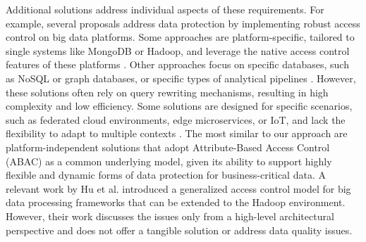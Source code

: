 Additional solutions address individual aspects of these requirements. For example, several proposals address data protection by implementing robust access control on big data platforms. Some approaches are platform-specific, tailored to single systems like MongoDB or Hadoop, and leverage the native access control features of these platforms \cite{rathore2017hadoop,anisetti2018privacy,FederationAC:Journ:2020,Sandhu:ABAC:2018,GuptaSandu:2017}. Other approaches focus on specific databases, such as NoSQL or graph databases, or specific types of analytical pipelines \cite{AConGraphDB:2021, AConMongoDB:2022, ABACforHBase:2019}. However, these solutions often rely on query rewriting mechanisms, resulting in high complexity and low efficiency. Some solutions are designed for specific scenarios, such as federated cloud environments, edge microservices, or IoT, and lack the flexibility to adapt to multiple contexts \cite{MultipartyAC:2019, IoTSecurity}.
%
The most similar to our approach are platform-independent solutions that adopt Attribute-Based Access Control (ABAC) \cite{XACML3.0} as a common underlying model, given its ability to support highly flexible and dynamic forms of data protection for business-critical data. A relevant work by Hu et al.  \cite{ HUFerraiolo:2014} introduced a generalized access control model for big data processing frameworks that can be extended to the Hadoop environment. However, their work discusses the issues only from a high-level architectural perspective and does not offer a tangible solution or address data quality issues.

